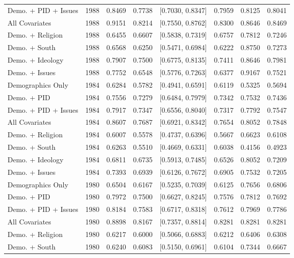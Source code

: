 \begin{longtable}{lrrrlrrr}
  Demo. + PID + Issues & 1988 & 0.8469 & 0.7738 & [0.7030, 0.8347] & 0.7959 & 0.8125 & 0.8041 \\ 
  All Covariates & 1988 & 0.9151 & 0.8214 & [0.7550, 0.8762] & 0.8300 & 0.8646 & 0.8469 \\ 
  Demo. + Religion & 1988 & 0.6455 & 0.6607 & [0.5838, 0.7319] & 0.6757 & 0.7812 & 0.7246 \\ 
  Demo. + South & 1988 & 0.6568 & 0.6250 & [0.5471, 0.6984] & 0.6222 & 0.8750 & 0.7273 \\ 
  Demo. + Ideology & 1988 & 0.7907 & 0.7500 & [0.6775, 0.8135] & 0.7411 & 0.8646 & 0.7981 \\ 
  Demo. + Issues & 1988 & 0.7752 & 0.6548 & [0.5776, 0.7263] & 0.6377 & 0.9167 & 0.7521 \\ 
  Demographics Only & 1984 & 0.6284 & 0.5782 & [0.4941, 0.6591] & 0.6119 & 0.5325 & 0.5694 \\ 
  Demo. + PID & 1984 & 0.7556 & 0.7279 & [0.6484, 0.7979] & 0.7342 & 0.7532 & 0.7436 \\ 
  Demo. + PID + Issues & 1984 & 0.7917 & 0.7347 & [0.6556, 0.8040] & 0.7317 & 0.7792 & 0.7547 \\ 
  All Covariates & 1984 & 0.8607 & 0.7687 & [0.6921, 0.8342] & 0.7654 & 0.8052 & 0.7848 \\ 
  Demo. + Religion & 1984 & 0.6007 & 0.5578 & [0.4737, 0.6396] & 0.5667 & 0.6623 & 0.6108 \\ 
  Demo. + South & 1984 & 0.6263 & 0.5510 & [0.4669, 0.6331] & 0.6038 & 0.4156 & 0.4923 \\ 
  Demo. + Ideology & 1984 & 0.6811 & 0.6735 & [0.5913, 0.7485] & 0.6526 & 0.8052 & 0.7209 \\ 
  Demo. + Issues & 1984 & 0.7393 & 0.6939 & [0.6126, 0.7672] & 0.6905 & 0.7532 & 0.7205 \\ 
  Demographics Only & 1980 & 0.6504 & 0.6167 & [0.5235, 0.7039] & 0.6125 & 0.7656 & 0.6806 \\ 
  Demo. + PID & 1980 & 0.7972 & 0.7500 & [0.6627, 0.8245] & 0.7576 & 0.7812 & 0.7692 \\ 
  Demo. + PID + Issues & 1980 & 0.8184 & 0.7583 & [0.6717, 0.8318] & 0.7612 & 0.7969 & 0.7786 \\ 
  All Covariates & 1980 & 0.8898 & 0.8167 & [0.7357, 0.8814] & 0.8281 & 0.8281 & 0.8281 \\ 
  Demo. + Religion & 1980 & 0.6217 & 0.6000 & [0.5066, 0.6883] & 0.6212 & 0.6406 & 0.6308 \\ 
  Demo. + South & 1980 & 0.6240 & 0.6083 & [0.5150, 0.6961] & 0.6104 & 0.7344 & 0.6667 \\ 

\end{longtable}
